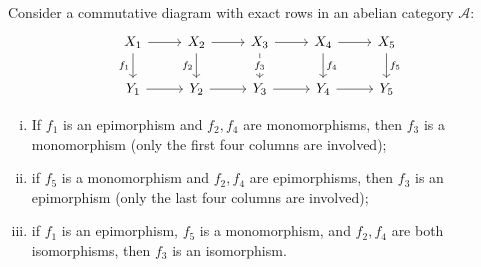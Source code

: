 \begin{proposition}\label{prop:5-lemma}
	Consider a commutative diagram with exact rows in an abelian category
	$\mathcal{A}$:
	\[\begin{tikzcd}
		X_1 \arrow[r] \arrow[d, "f_1"'] & X_2 \arrow[r] \arrow[d, "f_2"'] & X_3 \arrow[r] \arrow[d, "f_3" description] & X_4 \arrow[r] \arrow[d, "f_4"] & X_5 \arrow[d, "f_5"] \\
		Y_1 \arrow[r] & Y_2 \arrow[r] & Y_3 \arrow[r] & Y_4 \arrow[r] & Y_5
	\end{tikzcd}\]
	\begin{enumerate}[(i)]
		\item If $f_1$ is an epimorphism and $f_2,f_4$ are monomorphisms, then
		$f_3$ is a monomorphism (only the first four columns are involved);
		\item if $f_5$ is a monomorphism and $f_2,f_4$ are epimorphisms, then
		$f_3$ is an epimorphism (only the last four columns are involved);
		\item if $f_1$ is an epimorphism, $f_5$ is a monomorphism, and $f_2,f_4$
		are both isomorphisms, then $f_3$ is an isomorphism.
	\end{enumerate}
\end{proposition}
